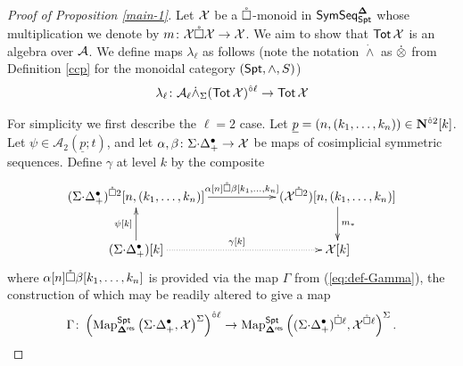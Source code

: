 \begin{proof}[Proof of Proposition \ref{main-1}]

Let $\mathcal{X}$ be a $\mathring{\square}$-monoid in $\mathsf{SymSeq}^{\mathbf{\Delta}}_{\mathsf{Spt}}$ whose multiplication we denote by $m\colon \mathcal{X}\mathring{\square} \mathcal{X}\to\mathcal{X}$. We aim to show that $\operatorname{\mathsf{Tot}} \mathcal{X}$ is an algebra over $\mathcal{A}$. We define maps $\lambda_{\ell}$ as follows (note the notation $\dot{\wedge}$ as $\dot{\otimes}$ from Definition \ref{ccp} for the monoidal category $(\mathsf{Spt},\wedge,S)$)\[
    \lambda_{\ell}\colon \Cal{A}_{\ell}\dot{\wedge}_{\Sigma} (\Tot \Cal{X})^{\circhat \ell} \to \Tot \Cal{X}    %
\]

For simplicity we first describe the $\ell=2$ case. Let $\underline{p}=(n,(k_1,\dots,k_n))\in\mathbf{N}^{\hat{\circ}2}[k]$. Let $\psi\in \mathcal{A}_2(\underline{p};t)$, and let $\alpha,\beta\colon \Sigma{\cdot}\Delta^{\bullet}_+\to \mathcal{X}$ be maps of cosimplicial symmetric sequences. Define $\gamma$ at level $k$ by the composite\begin{equation*} 
\xymatrix{
    (\SD_+)^{\boxcirc 2} [n, (k_1,\dots,k_n)] \ar[rr]^-{\alpha[n]\boxcirc \beta[k_1,\dots,k_n]} 
    && (\Cal{X}^{\boxcirc2})[n, (k_1,\dots,k_n)] \ar[d]^{m_*}\\
    (\SD_+)[k] \ar[u]^-{\psi[k]} \ar@{.>}[rr]^{\gamma[k]} && \Cal{X}[k] }
\end{equation*}
where $\alpha[n] \mathring{\square} \beta[k_1,\dots,k_n]$ is provided via the map $\Gamma$ from (\ref{eq:def-Gamma}), the construction of which may be readily altered to give a map  \[
        \Gamma \colon \left( \operatorname{Map}_{\mathbf{\Delta}^{\mathsf{res}}}^{\mathsf{Spt}} \left(\Sigma{\cdot}\Delta^{\bullet}_+, \mathcal{X}\right)^{\Sigma}\right)^{\hat{\circ} \ell} \to \operatorname{Map}_{\mathbf{\Delta}^{\mathsf{res}}}^{\mathsf{Spt}}\left((\Sigma{\cdot}\Delta^{\bullet}_+)^{\mathring{\square} \ell}, \mathcal{X}^{\mathring{\square} \ell}\right)^{\Sigma}.\] 


\end{proof}
